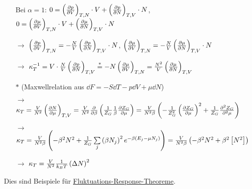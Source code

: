 \begin{itemize}[align=left]
\begin{itemize}[align=left]
    \item[Bei] $\alpha=1$: $0 = \left(\frac{\partial p}{\partial V}\right)_{T,N}\cdot V + \left(\frac{\partial p}{\partial N}\right)_{T,V}\cdot N$, $0 = \left(\frac{\partial \mu}{\partial V}\right)_{T,N}\cdot V + \left(\frac{\partial \mu}{\partial N}\right)_{T,V}\cdot N$
    \item[$\rightarrow$] $\left(\frac{\partial p}{\partial V}\right)_{T,N} = - \frac{N}{V} \left(\frac{\partial p}{\partial N}\right)_{T,V}\cdot N$, $\left(\frac{\partial \mu}{\partial V}\right)_{T,N} = - \frac{N}{V} \left(\frac{\partial \mu}{\partial N}\right)_{T,V}\cdot N$
    \item[$\rightarrow$] $\kappa_T^{-1} = V\cdot\frac{N}{V} \left(\frac{\partial p}{\partial N}\right)_{T,V} \stackrel{*}{=} - N \left(\frac{\partial \mu}{\partial V}\right)_{T,N} = \frac{N^2}{V} \left(\frac{\partial \mu}{\partial N}\right)_{T,V}$
    \item[$*$] (Maxwellrelation aus $\dd{F} = -S\dd{T} -p\dd{V} + \mu\dd{N}$)
    \item[$\rightarrow$] $\kappa_T = \frac{V}{N^2} \left(\frac{\partial N}{\partial \mu}\right)_{T,V} = \frac{V}{N^2} \frac{\partial }{\partial \beta} \left( \frac{1}{Z_G}\frac{1}{\beta}\frac{\partial Z_G}{\partial \mu} \right) = \frac{V}{N^2\beta}\left( -\frac{1}{Z_G^2}\left(\frac{\partial Z_G}{\partial \mu}\right)_{}^2+ \frac{1}{Z_G}\frac{\partial^{2} Z_G}{\partial^{2} \mu} \right)$
    \item[$\rightarrow$] $\kappa_T = \frac{V}{N^2\beta} \left( -\beta^2 N^2 + \frac{1}{Z_G}\sum\limits_j \left( \beta N_j \right)^2 e^{-\beta\left( E_j - \mu N_j \right)} \right) = \frac{V}{N^2\beta}\left( -\beta^2 N^2 + \beta^2 \left[ N^2 \right] \right)$
    \item[$\rightarrow$] $\kappa_T = \frac{V}{N^2} \frac{1}{k_B T} \left( \Delta N \right)^2$
  \end{itemize}
\end{itemize}
Dies sind Beispiele für \uline{Fluktuations-Response-Theoreme}.


